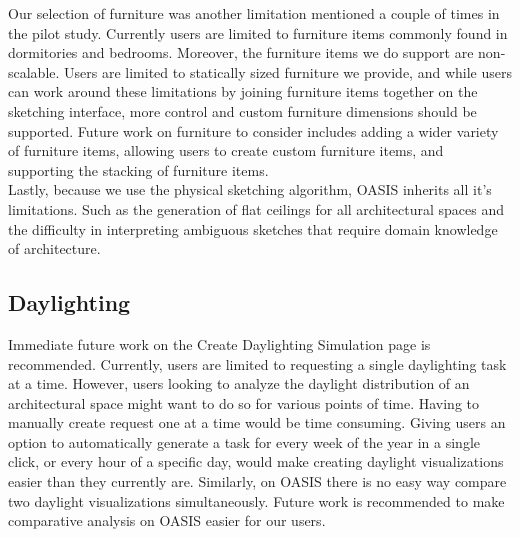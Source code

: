 Our selection of furniture was another limitation mentioned a couple of times in the pilot study. Currently users are limited to furniture items commonly found in dormitories and bedrooms. Moreover, the furniture items we do support are non-scalable. Users are limited to statically sized furniture we provide, and while users can work around these limitations by joining furniture items together on the sketching interface, more control and custom furniture dimensions should be supported. Future work on furniture to consider includes adding a wider variety of furniture items, allowing users to create custom furniture items, and supporting the stacking of furniture items.  \\


Lastly, because we use the physical sketching algorithm, OASIS inherits all it's limitations. Such as the generation of flat ceilings for all architectural spaces and the difficulty in interpreting ambiguous sketches that require domain knowledge of architecture.  \\





\subsection{Daylighting}


Immediate future work on the {Create Daylighting Simulation} page is recommended. Currently, users are limited to requesting a single daylighting task at a time. However, users looking to analyze the daylight distribution of an architectural space might want to do so for various points of time.  Having to manually create request one at a time would be time consuming.  Giving users an option to automatically generate a task for every week of the year in a single click, or every hour of a specific day, would make creating daylight visualizations easier than they currently are.  Similarly, on OASIS there is no easy way compare two daylight visualizations simultaneously. Future work is recommended to make comparative analysis on OASIS easier for our users.  \\

